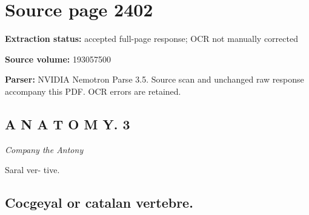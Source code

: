 \clearpage
\section{Source page 2402}
\textbf{Extraction status:} accepted full-page response; OCR not manually corrected\par
\textbf{Source volume:} 193057500\par
\textbf{Parser:} NVIDIA Nemotron Parse 3.5. Source scan and unchanged raw response accompany this PDF. OCR errors are retained.\par\medskip
\subsection*{A N A T O M Y. 3}
{\small\itshape Company
the
Antony\par}\medskip
Saral ver-
tive.\par\medskip
\subsection*{Cocgeyal
or catalan
vertebre.}
